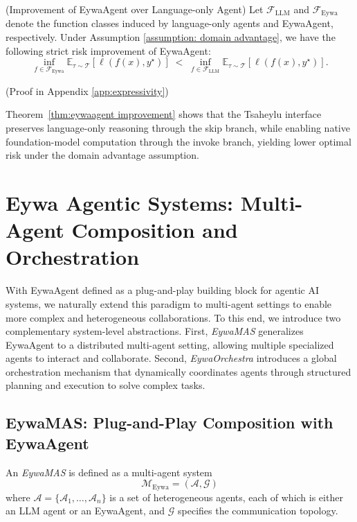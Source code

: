 \documentclass{llmxive}
\begin{document}
{\begin{theorem}\label{thm:eywaagent improvement}
(Improvement of EywaAgent over Language-only Agent)
Let $\mathcal{F}_{\mathrm{LLM}}$ and $\mathcal{F}_{\mathrm{Eywa}}$ denote the function classes induced by language-only agents and EywaAgent, respectively. Under Assumption \ref{assumption: domain advantage}, 
we have the following strict risk improvement of EywaAgent:
\begin{equation}
\inf_{f \in \mathcal{F}_{\mathrm{Eywa}}} 
\mathbb{E}_{\tau \sim \mathcal{T}}[\ell(f(x), y^\star)]
\;<\;
\inf_{f \in \mathcal{F}_{\mathrm{LLM}}} 
\mathbb{E}_{\tau \sim \mathcal{T}}[\ell(f(x), y^\star)].
\end{equation}
\end{theorem}
(Proof in Appendix \ref{app:expressivity}) 

Theorem~\ref{thm:eywaagent improvement} shows that the Tsaheylu interface preserves language-only reasoning through the skip branch, while enabling native foundation-model computation through the invoke branch, yielding lower optimal risk under the domain advantage assumption.

\section{Eywa Agentic Systems: Multi-Agent Composition and Orchestration}

With EywaAgent defined as a plug-and-play building block for agentic AI systems, we naturally extend this paradigm to multi-agent settings to enable more complex and heterogeneous collaborations. 
To this end, we introduce two complementary system-level abstractions. First, \textit{EywaMAS} generalizes EywaAgent to a distributed multi-agent setting, allowing multiple specialized agents to interact and collaborate. Second, \textit{EywaOrchestra} introduces a global orchestration mechanism that dynamically coordinates agents through structured planning and execution to solve complex tasks.

\subsection{EywaMAS: Plug-and-Play Composition with EywaAgent}

\begin{tcolorbox}[
  agentscope,
  float,
  floatplacement=h,
  title=\textbf{EywaMAS}
]
\begin{definition}[EywaMAS]
An \textit{EywaMAS} is defined as a multi-agent system
\begin{equation}
\mathcal{M}_{\mathrm{Eywa}} = (\mathcal{A}, \mathcal{G})
\end{equation}
where $\mathcal{A} = \{\mathcal{A}_1, \dots, \mathcal{A}_n\}$ is a set of heterogeneous agents, each of which is either an LLM agent or an EywaAgent, and $\mathcal{G}$ specifies the communication topology.
\end{definition}
\end{tcolorbox}

}
\end{document}
